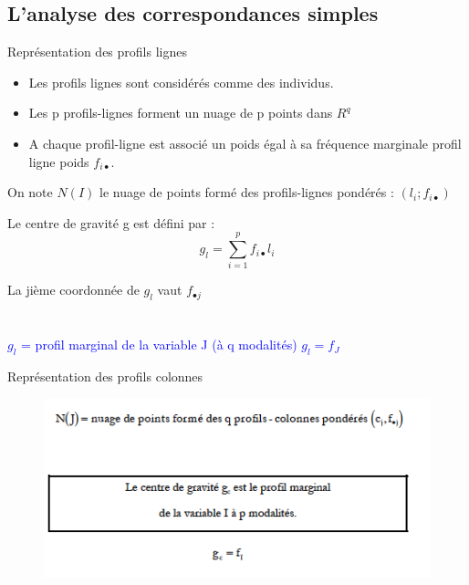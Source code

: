 \documentclass[10pt]{beamer}
\begin{document}
\subsection{L'analyse des correspondances simples}
 

\begin{frame}{Représentation des profils lignes}
\begin{itemize}
\item Les profils lignes sont considérés comme des individus.\\
\item Les p profils-lignes forment un nuage de p points dans $R^q$\\

\item A chaque profil-ligne est associé un poids égal à sa fréquence marginale profil ligne poids
$f_{i \bullet}$.
\end{itemize}
On note $N(I)$ le nuage de points formé des profils-lignes pondérés :
$( l_i; f_{i \bullet})$

Le centre de gravité g est défini par : $$ g_l=\sum_{i=1}^p f_{i \bullet}l_i$$

La jième coordonnée de $g_l$ vaut $f_{\bullet j}$\\~\\~\\

\textcolor{blue}{$g_l$ = profil marginal de la variable J (à q modalités) $g_l=f_J$}

\end{frame}
\begin{frame}{Représentation des profils colonnes}
\begin{figure}
\includegraphics[scale=0.7]{exemple10.png}  
\end{figure}
\end{frame}
\end{document}

